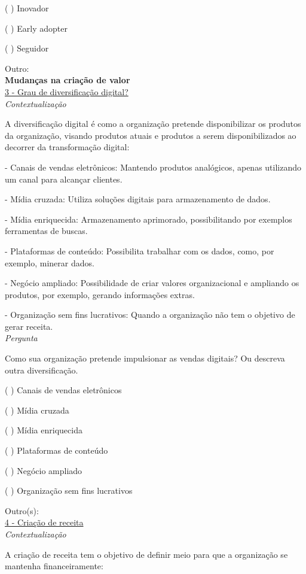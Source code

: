 ( ) Inovador

( ) Early adopter

( ) Seguidor

Outro:\\

\textbf{Mudanças na criação de valor}\\

\underline{3 - Grau de diversificação digital?}\\

\textit{Contextualização}

A diversificação digital é como a organização pretende disponibilizar os produtos da organização, visando produtos atuais e produtos a serem disponibilizados ao decorrer da transformação digital:

- Canais de vendas eletrônicos: Mantendo produtos analógicos, apenas utilizando um canal para alcançar clientes.

- Mídia cruzada: Utiliza soluções digitais para armazenamento de dados.

- Mídia enriquecida: Armazenamento aprimorado, possibilitando por exemplos ferramentas de buscas.

- Plataformas de conteúdo: Possibilita trabalhar com os dados, como, por exemplo, minerar dados.

- Negócio ampliado: Possibilidade de criar valores organizacional e ampliando os produtos, por exemplo, gerando informações extras.

- Organização sem fins lucrativos: Quando a organização não tem o objetivo de gerar receita.\\


\textit{Pergunta}

Como sua organização pretende impulsionar as vendas digitais? Ou descreva outra diversificação.

( ) Canais de vendas eletrônicos

( ) Mídia cruzada

( ) Mídia enriquecida

( ) Plataformas de conteúdo

( ) Negócio ampliado

( ) Organização sem fins lucrativos

Outro(s):\\


\underline{4 - Criação de receita}\\

\textit{Contextualização}

A criação de receita tem o objetivo de definir meio para que a organização se mantenha financeiramente:

